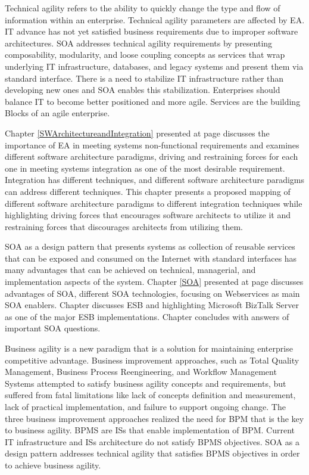 \documentclass[12pt,a4paper,final,twoside,onecolumn,titlepage]{book}
\begin{document}
Technical agility refers to the ability to quickly change the type and flow of information within an enterprise. Technical agility parameters are affected by \gls{EA}. IT advance has not yet satisfied business requirements due to improper software architectures. \gls{SOA} addresses technical agility requirements by presenting composability, modularity, and loose coupling concepts as services that wrap underlying IT infrastructure, databases, and legacy systems and present them via standard interface. There is a need to stabilize IT infrastructure rather than developing new ones and \gls{SOA} enables this stabilization. Enterprises should balance IT to become better positioned and more agile. Services are the building Blocks of an agile enterprise. 

Chapter \ref{SWArchitectureandIntegration} presented at page \pageref{SWArchitectureandIntegration} discusses the importance of \gls{EA} in meeting systems non-functional requirements and examines different software architecture paradigms, driving and restraining forces for each one in meeting systems integration as one of the most desirable requirement. Integration has different techniques, and different software architecture paradigms can address different techniques. This chapter presents a proposed mapping of different software architecture paradigms to different integration techniques while highlighting driving forces that encourages software architects to utilize it and restraining forces that discourages architects from utilizing them.

\gls{SOA} as a design pattern that presents systems as collection of reusable services that can be exposed and consumed on the Internet with standard interfaces has many advantages that can be achieved on technical, managerial, and implementation aspects of the system. Chapter \ref{SOA} presented at page \pageref{SOA} discusses advantages of \gls{SOA}, different \gls{SOA} technologies, focusing on Webservices as main \gls{SOA} enablers. Chapter discusses \gls{ESB} and highlighting Microsoft BizTalk Server as one of the major \gls{ESB} implementations. Chapter concludes with answers of important \gls{SOA} questions.

Business agility is a new paradigm that is a solution for maintaining enterprise competitive advantage. Business improvement approaches, such as Total Quality Management, Business Process Reengineering, and Workflow Management Systems attempted to satisfy business agility concepts and requirements, but suffered from fatal limitations like lack of concepts definition and measurement, lack of practical implementation, and failure to support ongoing change. The three business improvement approaches realized the need for \gls{BPM} that is the key to business agility. \gls{BPMS} are \gls{IS}s that enable implementation of \gls{BPM}. Current IT infrastructure and \gls{IS}s architecture do not satisfy \gls{BPMS} objectives. \gls{SOA} as a design pattern addresses technical agility that satisfies \gls{BPMS} objectives in order to achieve business agility. 
\end{document}
